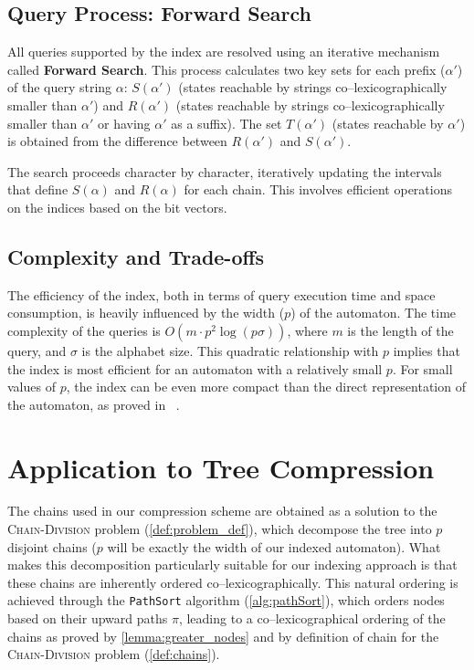 \subsection{Query Process: Forward Search} 
All queries supported by the index are resolved using an iterative mechanism called \textbf{Forward Search}. This process calculates two key sets for each prefix ($\alpha'$) of the query string $\alpha$: $S(\alpha')$ (states reachable by strings co--lexicographically smaller than $\alpha'$) and $R(\alpha')$ (states reachable by strings co--lexicographically smaller than $\alpha'$ or having $\alpha'$ as a suffix). The set $T(\alpha')$ (states reachable by $\alpha'$) is obtained from the difference between $R(\alpha')$ and $S(\alpha')$.

The search proceeds character by character, iteratively updating the intervals that define $S(\alpha)$ and $R(\alpha)$ for each chain. This involves efficient operations on the indices based on the bit vectors.

\subsection{Complexity and Trade-offs} 
The efficiency of the index, both in terms of query execution time and space consumption, is heavily influenced by the width ($p$) of the automaton. The time complexity of the queries is $O(m \cdot p^2 \log(p\sigma))$, where $m$ is the length of the query, and $\sigma$ is the alphabet size. This quadratic relationship with $p$ implies that the index is most efficient for an automaton with a relatively small $p$. For small values of $p$, the index can be even more compact than the direct representation of the automaton, as proved in ~\cite{maso2023indexing}.

\section{Application to Tree Compression}
The chains used in our compression scheme are obtained as a solution to the \textsc{Chain-Division} problem (\cref{def:problem_def}), which decompose the tree into $p$ disjoint chains ($p$ will be exactly the width of our indexed automaton). What makes this decomposition particularly suitable for our indexing approach is that these chains are inherently ordered co--lexicographically. This natural ordering is achieved through the \texttt{PathSort} algorithm (\cref{alg:pathSort}), which orders nodes based on their upward paths $\pi$, leading to a co--lexicographical ordering of the chains as proved by \cref{lemma:greater_nodes} and by definition of chain for the \textsc{Chain-Division} problem (\cref{def:chains}).

